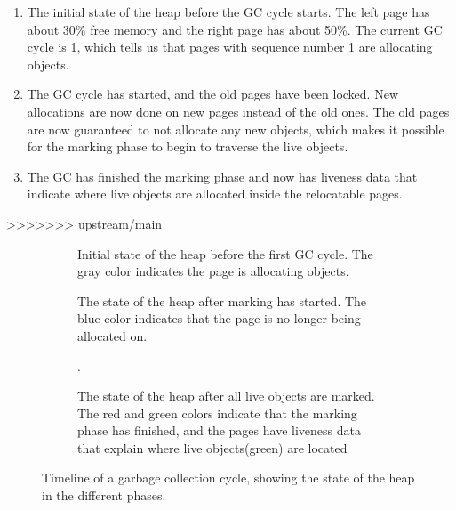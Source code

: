\vspace*{-0.4cm}

\begin{enumerate}[label=\alph*)]
    \item The initial state of the heap before the GC cycle starts. The left page has about 30\% free memory and the right page has about 50\%. The current GC cycle is 1, which tells us that pages with sequence number 1 are allocating objects.
    \item The GC cycle has started, and the old pages have been locked. New allocations are now done on new pages instead of the old ones. The old pages are now guaranteed to not allocate any new objects, which makes it possible for the marking phase to begin to traverse the live objects.
    \item The GC has finished the marking phase and now has liveness data that indicate where live objects are allocated inside the relocatable pages.
\end{enumerate}

\vspace*{-0.4cm}
>>>>>>> upstream/main

\begin{figure}[H]
    \centering
    \begin{subfigure}[t]{.214\textwidth}
        \centering
        
        \caption{Initial state of the heap before the first GC cycle. The gray color indicates the page is allocating objects.}
        \label{fig:zrel1}
    \end{subfigure}
    \hfill\vline\hfill
    \begin{subfigure}[t]{.32\textwidth}
        \centering
        
        \caption{The state of the heap after marking has started. The blue color indicates that the page is no longer being allocated on.}
        \label{fig:zrel2}
    \end{subfigure}
    \hfill\vline\hfill
    \begin{subfigure}[t]{.32\textwidth}
        \centering
        
        \caption{The state of the heap after all live objects are marked. The red and green colors indicate that the marking phase has finished, and the pages have liveness data that explain where live objects(green) are located}.
        \label{fig:zrel3}
    \end{subfigure}
    \caption{Timeline of a garbage collection cycle, showing the state of the heap in the different phases.}
    \label{fig:zgc_timeline}
\end{figure}

